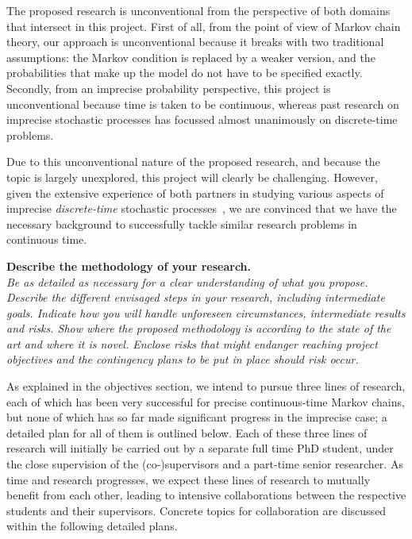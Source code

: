 \documentclass[11pt,dvipsnames,usenames,a4paper]{article}
\begin{document}
The proposed research is unconventional from the perspective of both domains that intersect in this project.
First of all, from the point of view of Markov chain theory, our approach is unconventional because it breaks with two traditional assumptions: the Markov condition is replaced by a weaker version, and the probabilities that make up the model do not have to be specified exactly. Secondly, from an imprecise probability perspective, this project is unconventional because time is taken to be continuous, whereas past research on imprecise stochastic processes has focussed almost unanimously on discrete-time problems.

Due to this unconventional nature of the proposed research, and because the topic is largely unexplored, this project will clearly be challenging. 
However, given the extensive experience of both partners in studying various aspects of imprecise \emph{discrete-time} stochastic processes~\cite{cooman2007d,cooman2008,hermans2012,cooman2015:markovergodic}, we are convinced that we have the necessary background to successfully tackle similar research problems in continuous time.


\vspace{7pt}

\textbf{Describe the methodology of your research.}\\
\textit{Be as detailed as necessary for a clear understanding of what you propose.
Describe the different envisaged steps in your research, including intermediate goals. Indicate how you will handle unforeseen circumstances, intermediate results and risks.
Show where the proposed methodology is according to the state of the art and where it is novel.
Enclose risks that might endanger reaching project objectives and the contingency plans to be put in place should risk occur.}

As explained in the objectives section, we intend to pursue three lines of research, each of which has been very successful for precise continuous-time Markov chains, but none of which has so far made significant progress in the imprecise case; a detailed plan for all of them is outlined below. Each of these three lines of research will initially be carried out by a separate full time PhD student, under the close supervision of the (co-)supervisors and a part-time senior researcher. As time and research progresses, we expect these lines of research to mutually benefit from each other, leading to intensive collaborations between the respective students and their supervisors. Concrete topics for collaboration are discussed within the following detailed plans.
\end{document}
